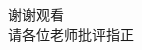 \documentclass{beamer}
\begin{document}
\begin{frame}
    \begin{center}
        {\Large 谢谢观看}\\
        {\Large 请各位老师批评指正}
    \end{center}
\end{frame}





\end{document}
